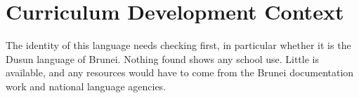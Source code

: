 \documentclass[12pt]{article}
\begin{document}
\section{Curriculum Development Context}
The identity of this language needs checking first, in particular whether it is the Dusun language of Brunei. Nothing found shows any school use. Little is available, and any resources would have to come from the Brunei documentation work and national language agencies.
\end{document}
